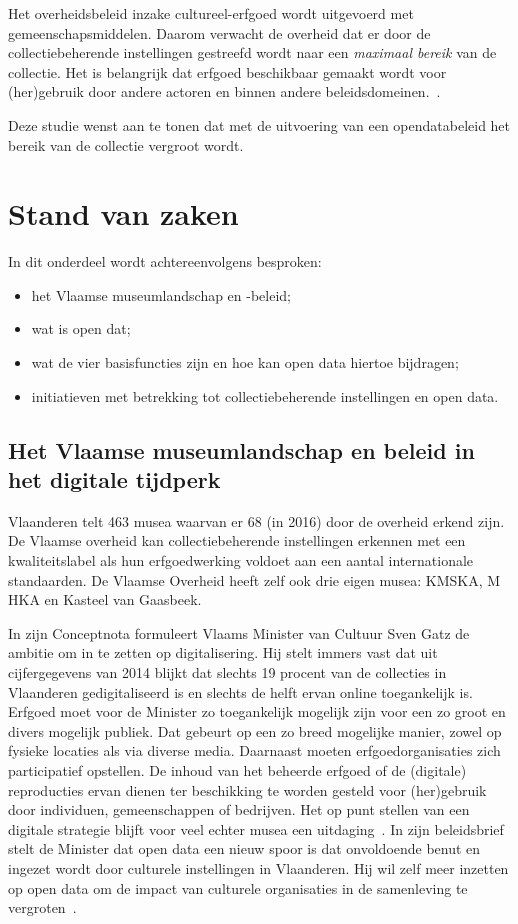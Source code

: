\documentclass[fleqn,10pt]{voorstel}
\begin{document}
Het overheidsbeleid inzake cultureel-erfgoed wordt uitgevoerd met gemeenschapsmiddelen. Daarom verwacht de overheid dat er door de collectiebeherende instellingen gestreefd wordt naar een \emph{maximaal bereik} van de collectie. Het is belangrijk dat erfgoed beschikbaar gemaakt wordt voor (her)gebruik door andere actoren en binnen andere beleidsdomeinen.~\autocite{Gatz2016}. 

Deze studie wenst aan te tonen dat met de uitvoering  van een opendatabeleid het bereik van de collectie vergroot wordt.


\section{Stand van zaken}
\label{sec:state-of-the-art}

In dit onderdeel wordt achtereenvolgens besproken:
\begin{itemize}
	\item het Vlaamse museumlandschap en -beleid;
	\item wat is open dat;
	\item wat de vier basisfuncties zijn en hoe kan open data hiertoe bijdragen;
	\item initiatieven met betrekking tot collectiebeherende instellingen en open data.
\end{itemize}

\subsection{Het Vlaamse museumlandschap en beleid in het digitale tijdperk}
Vlaanderen telt 463 musea waarvan er 68 (in 2016) door de overheid erkend zijn. De Vlaamse overheid kan collectiebeherende instellingen erkennen met een kwaliteitslabel als hun erfgoedwerking voldoet aan een aantal internationale standaarden. De Vlaamse Overheid heeft zelf ook drie eigen musea: KMSKA, M HKA en Kasteel van Gaasbeek. 

In zijn Conceptnota formuleert Vlaams Minister van Cultuur Sven Gatz de ambitie om in te zetten op digitalisering. Hij stelt immers vast dat uit cijfergegevens van 2014 blijkt dat slechts 19 procent van de collecties in Vlaanderen gedigitaliseerd is en slechts de helft ervan online toegankelijk is. Erfgoed moet voor de Minister zo toegankelijk mogelijk zijn voor een zo groot en divers mogelijk publiek. Dat gebeurt op een zo breed mogelijke manier, zowel op fysieke locaties als via diverse media. Daarnaast moeten erfgoedorganisaties zich participatief opstellen. De inhoud van het beheerde erfgoed of de (digitale) reproducties ervan dienen ter beschikking te worden gesteld voor (her)gebruik door individuen, gemeenschappen of bedrijven. Het op punt stellen van een digitale strategie blijft voor veel echter musea een uitdaging~\autocite{Gatz2016}. In zijn beleidsbrief stelt de Minister dat open data een nieuw spoor is dat onvoldoende benut en ingezet wordt door culturele instellingen in Vlaanderen. Hij wil zelf meer inzetten op open data om de impact van culturele organisaties in de samenleving te vergroten~\autocite{Gatz2014}.
\end{document}
